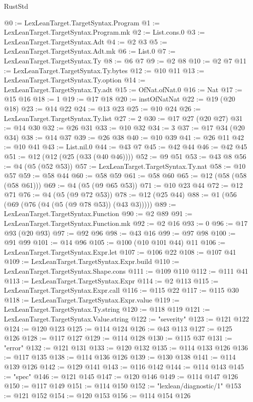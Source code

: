 \begin{lexlean}{RustStd}
\begin{coremodule}
{\begin{coremodule}
{{{{{{{{{{{{{{{{{{{{{{{{{{{{{{{{{{{{{{{{{{{{{{{{{{@0 := LexLeanTarget.TargetSyntax.Program
@1 := LexLeanTarget.TargetSyntax.Program.mk
@2 := List.cons.{0}
@3 := LexLeanTarget.TargetSyntax.Adt
@4 := @2 @3
@5 := LexLeanTarget.TargetSyntax.Adt.mk
@6 := List.{0}
@7 := LexLeanTarget.TargetSyntax.Ty
@8 := @6 @7
@9 := @2 @8
@10 := @2 @7
@11 := LexLeanTarget.TargetSyntax.Ty.bytes
@12 := @10 @11
@13 := LexLeanTarget.TargetSyntax.Ty.option
@14 := LexLeanTarget.TargetSyntax.Ty.adt
@15 := OfNat.ofNat.{0}
@16 := Nat
@17 := @15 @16
@18 := 1
@19 := @17 @18
@20 := instOfNatNat
@22 := @19 (@20 @18)
@23 := @14 @22
@24 := @13 @23
@25 := @10 @24
@26 := LexLeanTarget.TargetSyntax.Ty.list
@27 := 2
@30 := @17 @27 (@20 @27)
@31 := @14 @30
@32 := @26 @31
@33 := @10 @32
@34 := 3
@37 := @17 @34 (@20 @34)
@38 := @14 @37
@39 := @26 @38
@40 := @10 @39
@41 := @26 @11
@42 := @10 @41
@43 := List.nil.{0}
@44 := @43 @7
@45 := @42 @44
@46 := @42 @45
@51 := @12 (@12 (@25 (@33 (@40 @46))))
@52 := @9 @51
@53 := @43 @8
@56 := @4 (@5 (@52 @53))
@57 := LexLeanTarget.TargetSyntax.Ty.nat
@58 := @10 @57
@59 := @58 @44
@60 := @58 @59
@61 := @58 @60
@65 := @12 (@58 (@58 (@58 @61)))
@69 := @4 (@5 (@9 @65 @53))
@71 := @10 @23 @44
@72 := @12 @71
@76 := @4 (@5 (@9 @72 @53))
@78 := @12 (@25 @44)
@88 := @1 (@56 (@69 (@76 (@4 (@5 (@9 @78 @53)) (@43 @3)))))
@89 := LexLeanTarget.TargetSyntax.Function
@90 := @2 @89
@91 := LexLeanTarget.TargetSyntax.Function.mk
@92 := @2 @16
@93 := 0
@96 := @17 @93 (@20 @93)
@97 := @92 @96
@98 := @43 @16
@99 := @97 @98
@100 := @91 @99
@101 := @14 @96
@105 := @100 (@10 @101 @44) @11
@106 := LexLeanTarget.TargetSyntax.Expr.let
@107 := @106 @22
@108 := @107 @41
@109 := LexLeanTarget.TargetSyntax.Expr.build
@110 := LexLeanTarget.TargetSyntax.Shape.cons
@111 := @109 @110
@112 := @111 @41
@113 := LexLeanTarget.TargetSyntax.Expr
@114 := @2 @113
@115 := LexLeanTarget.TargetSyntax.Expr.call
@116 := @115 @22
@117 := @115 @30
@118 := LexLeanTarget.TargetSyntax.Expr.value
@119 := LexLeanTarget.TargetSyntax.Ty.string
@120 := @118 @119
@121 := LexLeanTarget.TargetSyntax.Value.string
@122 := "severity"
@123 := @121 @122
@124 := @120 @123
@125 := @114 @124
@126 := @43 @113
@127 := @125 @126
@128 := @117 @127
@129 := @114 @128
@130 := @115 @37
@131 := "error"
@132 := @121 @131
@133 := @120 @132
@135 := @114 @133 @126
@136 := @117 @135
@138 := @114 @136 @126
@139 := @130 @138
@141 := @114 @139 @126
@142 := @129 @141
@143 := @116 @142
@144 := @114 @143
@145 := "spec"
@146 := @121 @145
@147 := @120 @146
@149 := @114 @147 @126
@150 := @117 @149
@151 := @114 @150
@152 := "lexlean/diagnostic/1"
@153 := @121 @152
@154 := @120 @153
@156 := @114 @154 @126
}}}}}}}}}}}}}}}}}}}}}}}}}}}}}}}}}}}}}}}}}}}}}}}}}}
\end{coremodule}}
\end{coremodule}
\end{lexlean}
